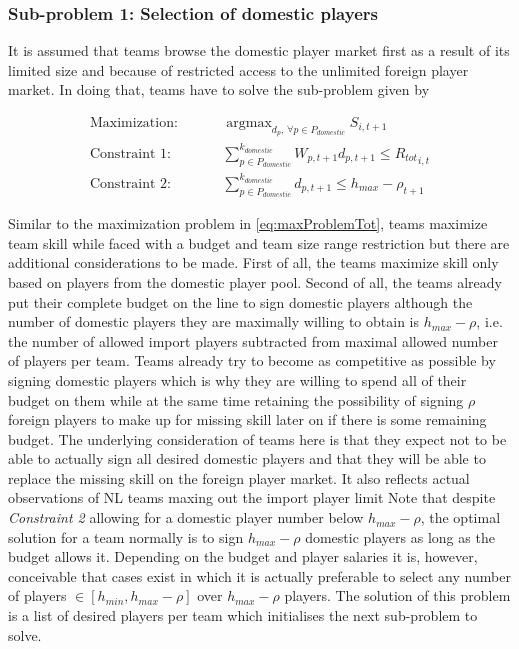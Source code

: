 \documentclass[12pt, a4paper]{article}
\DeclareMathOperator*{\argmax}{argmax} %
\begin{document}
\subsubsection{Sub-problem 1: Selection of domestic players}
\label{subProblem1}

It is assumed that teams browse the domestic player market first as a result of its limited size and because of  restricted access to the unlimited foreign player market. In doing that, teams have to solve the sub-problem given by

\begin{equation}
\label{eq:subProblme1}
\begin{aligned}
\textrm{Maximization:} & \hspace{1cm} \argmax_{d_p, \, \forall p \in P_{domestic}} S_{i, t+1} \\
\textrm{Constraint 1:} & \hspace{1cm} \sum_{p \in P_{domestic}}^{k_{domestic}}{W_{p,t+1}d_{p,t+1}}\le{R_{tot}}_{i,t}\\
\textrm{Constraint 2:} & \hspace{1cm} \sum_{p \in P_{domestic}}^{k_{domestic}}d_{p, t+1} \leq h_{max}-\rho_{t+1} 
\end{aligned}
\end{equation}

\noindent
Similar to the maximization problem in \ref{eq:maxProblemTot}, teams maximize team skill while faced with a budget and team size range restriction but there are additional considerations to be made. First of all, the teams maximize skill only based on players from the domestic player pool. Second of all, the teams already put their complete budget on the line to sign domestic players although the number of domestic players they are maximally willing to obtain is $h_{max}-\rho$, i.e. the number of allowed import players subtracted from maximal allowed number of players per team. Teams already try to become as competitive as possible by signing domestic players which is why they are willing to spend all of their budget on them while at the same time retaining the possibility of signing $\rho$ foreign players to make up for missing skill later on if there is some remaining budget. The underlying consideration of teams here is that they expect not to be able to actually sign all desired domestic players and that they will be able to replace the missing skill on the foreign player market. It also reflects actual observations of NL teams maxing out the import player limit \cite[see][]{burgler_geldprobleme_2022} Note that despite \emph{Constraint 2} allowing for a domestic player number below $h_{max}-\rho$, the optimal solution for a team normally is to sign $h_{max}-\rho$ domestic players as long as the budget allows it. Depending on the budget and player salaries it is, however, conceivable that cases exist in which it is actually preferable to select any number of players $\in [h_{min},h_{max}-\rho]$ over $h_{max}-\rho$ players. The solution of this problem is a list of desired players per team which initialises the next sub-problem to solve.
\end{document}
